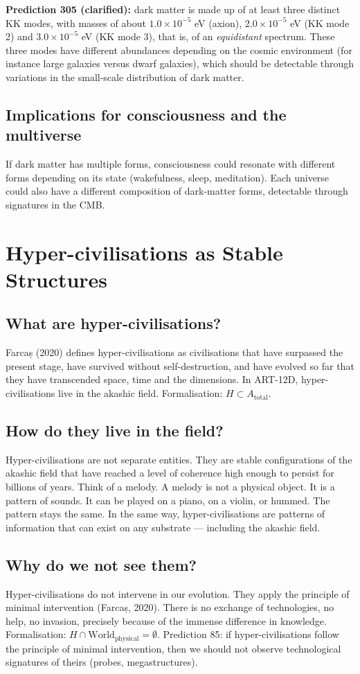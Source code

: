 \textbf{Prediction 305 (clarified):} dark matter is made up of at least three distinct KK modes, with masses of about $1.0\times10^{-5}$ eV (axion), $2.0\times10^{-5}$ eV (KK mode 2) and $3.0\times10^{-5}$ eV (KK mode 3), that is, of an \emph{equidistant} spectrum. These three modes have different abundances depending on the cosmic environment (for instance large galaxies versus dwarf galaxies), which should be detectable through variations in the small-scale distribution of dark matter.

\subsection{Implications for consciousness and the multiverse}
If dark matter has multiple forms, consciousness could resonate with different forms depending on its state (wakefulness, sleep, meditation). Each universe could also have a different composition of dark-matter forms, detectable through signatures in the CMB.

\section{Hyper-civilisations as Stable Structures}
\subsection{What are hyper-civilisations?}
Farcaș (2020) defines hyper-civilisations as civilisations that have surpassed the present stage, have survived without self-destruction, and have evolved so far that they have transcended space, time and the dimensions. In ART-12D, hyper-civilisations live in the akashic field. Formalisation: $H \subset A_{\text{total}}$.

\subsection{How do they live in the field?}
Hyper-civilisations are not separate entities. They are stable configurations of the akashic field that have reached a level of coherence high enough to persist for billions of years. Think of a melody. A melody is not a physical object. It is a pattern of sounds. It can be played on a piano, on a violin, or hummed. The pattern stays the same. In the same way, hyper-civilisations are patterns of information that can exist on any substrate --- including the akashic field.

\subsection{Why do we not see them?}
Hyper-civilisations do not intervene in our evolution. They apply the principle of minimal intervention (Farcaș, 2020). There is no exchange of technologies, no help, no invasion, precisely because of the immense difference in knowledge. Formalisation: $H \cap \text{World}_{\text{physical}} = \emptyset$. Prediction 85: if hyper-civilisations follow the principle of minimal intervention, then we should not observe technological signatures of theirs (probes, megastructures).

